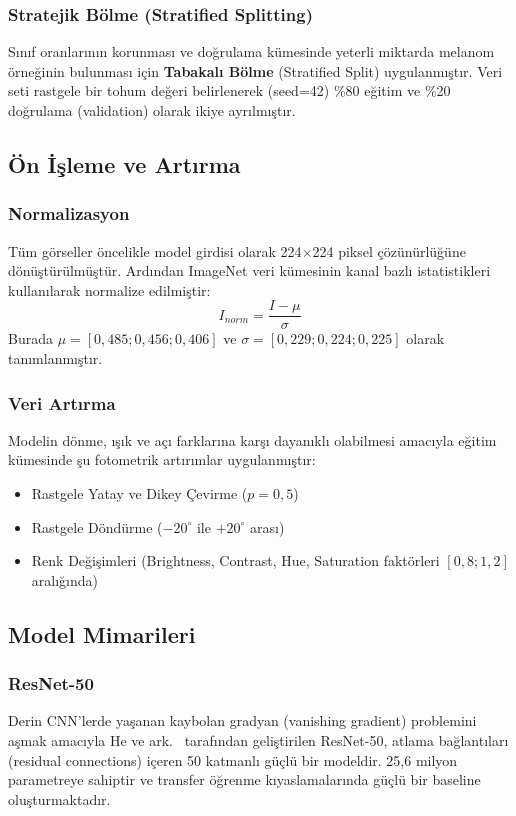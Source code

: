 \documentclass[12pt,a4paper]{article}
\begin{document}
\subsubsection{Stratejik Bölme (Stratified Splitting)}
Sınıf oranlarının korunması ve doğrulama kümesinde yeterli miktarda melanom örneğinin bulunması için \textbf{Tabakalı Bölme} (Stratified Split) uygulanmıştır. Veri seti rastgele bir tohum değeri belirlenerek (seed=42) \%80 eğitim ve \%20 doğrulama (validation) olarak ikiye ayrılmıştır.

\subsection{Ön İşleme ve Artırma}

\subsubsection{Normalizasyon}
Tüm görseller öncelikle model girdisi olarak 224$\times$224 piksel çözünürlüğüne dönüştürülmüştür. Ardından ImageNet veri kümesinin kanal bazlı istatistikleri kullanılarak normalize edilmiştir:
\begin{equation}
    I_{norm} = \frac{I - \mu}{\sigma}
\end{equation}
Burada $\mu = [0,485; 0,456; 0,406]$ ve $\sigma = [0,229; 0,224; 0,225]$ olarak tanımlanmıştır.

\subsubsection{Veri Artırma}
Modelin dönme, ışık ve açı farklarına karşı dayanıklı olabilmesi amacıyla eğitim kümesinde şu fotometrik artırımlar uygulanmıştır:
\begin{itemize}
    \item Rastgele Yatay ve Dikey Çevirme ($p=0,5$)
    \item Rastgele Döndürme ($-20^\circ$ ile $+20^\circ$ arası)
    \item Renk Değişimleri (Brightness, Contrast, Hue, Saturation faktörleri $[0,8; 1,2]$ aralığında)
\end{itemize}

\subsection{Model Mimarileri}

\subsubsection{ResNet-50}
Derin CNN'lerde yaşanan kaybolan gradyan (vanishing gradient) problemini aşmak amacıyla He ve ark.~\cite{he2016} tarafından geliştirilen ResNet-50, atlama bağlantıları (residual connections) içeren 50 katmanlı güçlü bir modeldir. 25,6 milyon parametreye sahiptir ve transfer öğrenme kıyaslamalarında güçlü bir baseline oluşturmaktadır.
\end{document}
